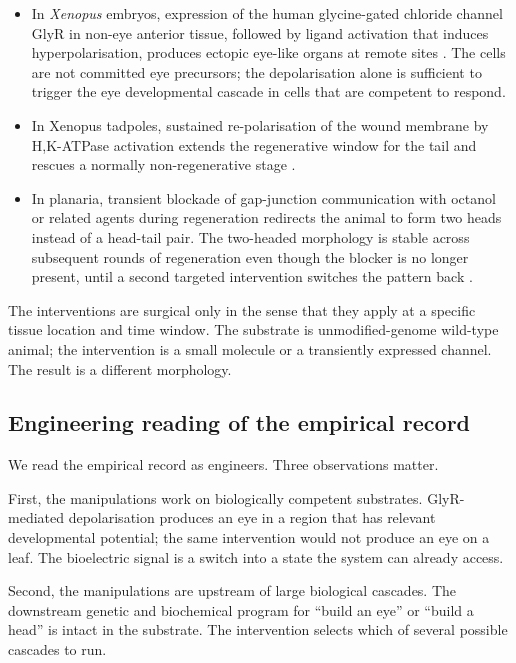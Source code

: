\begin{itemize}
\item In \textit{Xenopus} embryos, expression of the human
glycine-gated chloride channel GlyR in non-eye anterior tissue,
followed by ligand activation that induces hyperpolarisation, produces
ectopic eye-like organs at remote sites \cite{paper:v6c13-pai-eye-2012}.
The cells are not committed eye precursors; the depolarisation alone is
sufficient to trigger the eye developmental cascade in cells that are
competent to respond.
\item In Xenopus tadpoles, sustained re-polarisation of the wound
membrane by H,K-ATPase activation extends the regenerative window for
the tail and rescues a normally non-regenerative stage
\cite{paper:v6c13-tseng-tail-2010}.
\item In planaria, transient blockade of gap-junction communication
with octanol or related agents during regeneration redirects the
animal to form two heads instead of a head-tail pair. The two-headed
morphology is stable across subsequent rounds of regeneration even
though the blocker is no longer present, until a second targeted
intervention switches the pattern back
\cite{paper:v6c13-oviedo-planarian-2010}.
\end{itemize}

The interventions are surgical only in the sense that they apply at a
specific tissue location and time window. The substrate is
unmodified-genome wild-type animal; the intervention is a small
molecule or a transiently expressed channel. The result is a different
morphology.

\subsection{Engineering reading of the empirical record}

We read the empirical record as engineers. Three observations matter.

First, the manipulations work on biologically competent substrates.
GlyR-mediated depolarisation produces an eye in a region that has
relevant developmental potential; the same intervention would not
produce an eye on a leaf. The bioelectric signal is a switch into a
state the system can already access.

Second, the manipulations are upstream of large biological cascades.
The downstream genetic and biochemical program for ``build an eye'' or
``build a head'' is intact in the substrate. The intervention selects
which of several possible cascades to run.


